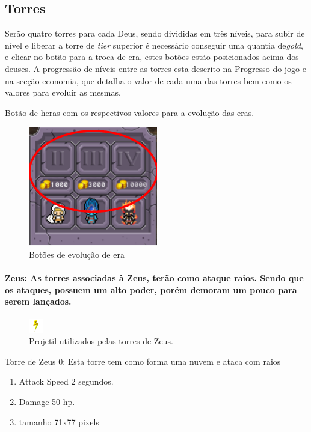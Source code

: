 \documentclass[11pt]{article} %
\begin{document}
\newpage


\subsection{Torres}
Serão quatro torres para cada Deus, sendo divididas em três níveis, para subir de nível e liberar a torre de \textit{tier} superior é necessário conseguir uma quantia de\textit{gold}, e clicar no botão para a troca de era, estes botões estão posicionados acima dos deuses. A progressão de níveis entre as torres esta descrito na Progresso do jogo e na secção economia, que detalha o valor de cada uma das torres bem como os valores para evoluir as mesmas.

Botão de heras com os respectivos valores para a evolução das eras.
\begin{figure}[!htp]
\centering
\includegraphics[scale=1]{res/era_button.png}
\caption{Botões de evolução de era}
\label{Butões de evolução de era}
\end{figure}

\paragraph{{\Large Zeus}: As torres associadas à Zeus, terão como ataque raios. Sendo que os ataques, possuem um alto poder, porém demoram um pouco para serem lançados.}

\begin{figure}[!htp]
\centering
\includegraphics[scale=1]{res/projectiles/projetil_zeus2.png}
\caption{Projetil utilizados pelas torres de Zeus.}
\end{figure}

Torre de Zeus 0: Esta torre tem como forma uma nuvem e ataca com raios
\begin{enumerate}
\item Attack Speed 2 segundos.
\item Damage 50 hp.
\item tamanho 71x77 pixels
\end{enumerate}
\end{document}
